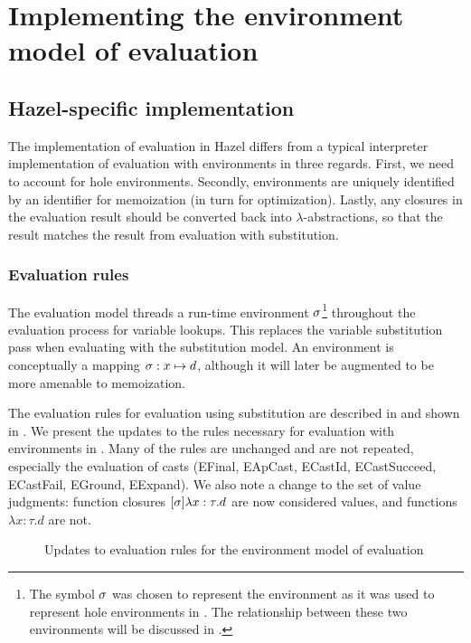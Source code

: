 \chapter{Implementing the environment model of evaluation}
\label{sec:env_model_evaluation}

\section{Hazel-specific implementation}
\label{sec:eval_with_envs}

The implementation of evaluation in Hazel differs from a typical interpreter implementation of evaluation with environments in three regards. First, we need to account for hole environments. Secondly, environments are uniquely identified by an identifier for memoization (in turn for optimization). Lastly, any closures in the evaluation result should be converted back into $\lambda$-abstractions, so that the result matches the result from evaluation with substitution.

\subsection{Evaluation rules}
\label{sec:evalenv-rules}

The evaluation model threads a run-time environment $\sigma$\footnote{The symbol $\sigma$ was chosen to represent the environment as it was used to represent hole environments in \cite{conf/popl/HazelnutLive19}. The relationship between these two environments will be discussed in .} throughout the evaluation process for variable lookups. This replaces the variable substitution pass when evaluating with the substitution model. An environment is conceptually a mapping $\sigma:x\mapsto d$, although it will later be augmented to be more amenable to memoization.

The evaluation rules for evaluation using substitution are described in  and shown in . We present the updates to the rules necessary for evaluation with environments in . Many of the rules are unchanged and are not repeated, especially the evaluation of casts (EFinal, EApCast, ECastId, ECastSucceed, ECastFail, EGround, EExpand). We also note a change to the set of value judgments: function closures $[\sigma]\lambda x:\tau.d$ are now considered values, and functions $\lambda x:\tau.d$ are not.

\begin{figure}
  \centering
  \begin{mdframed}
    \begin{singlespace}
      
    \end{singlespace}
  \end{mdframed}
  \caption{Updates to evaluation rules for the environment model of evaluation}
  \label{fig:big-step-formal}
\end{figure}

